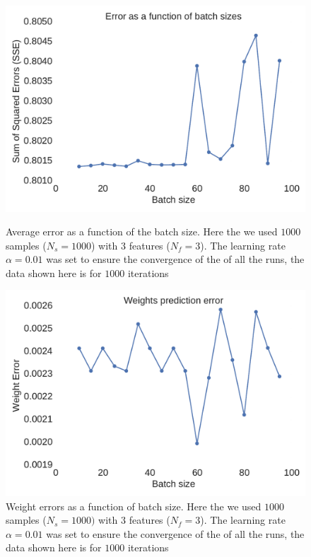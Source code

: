 \documentclass[11pt,a4paper]{article}
\begin{document}
\begin{figure}[H]
	\centering
  \includegraphics[width=\linewidth]{errors_batch_scaling.pdf}
  \caption{Average error as a function of the batch size. Here the we used $1000$ samples ($N_s=1000$) with $3$ features ($N_f=3$). The learning rate $\alpha=0.01$ was set to ensure the convergence of the of all the runs, the data shown here is for $1000$ iterations}
  \label{fig:test_batch_size_error}
\endminipage
\hfill
{}
  \includegraphics[width=\linewidth]{weights_errors_batch_scaling.pdf}
  \caption{Weight errors as a function of batch size. Here the we used $1000$ samples ($N_s=1000) $ with $3$ features ($N_f=3$). The learning rate $\alpha=0.01$ was set to ensure the convergence of the of all the runs, the data shown here is for $1000$ iterations}
  \label{fig:test_batch_size_werror}
\endminipage
\end{figure}
\end{document}
